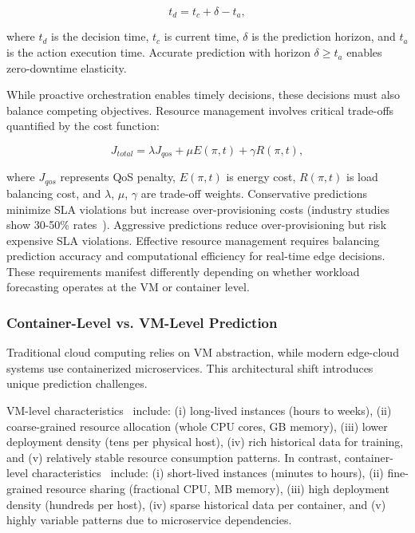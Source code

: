 \begin{equation}
t_d = t_c + \delta - t_a,
\end{equation}

where $t_d$ is the decision time, $t_c$ is current time, $\delta$ is the prediction horizon, and $t_a$ is the action execution time. Accurate prediction with horizon $\delta \geq t_a$ enables zero-downtime elasticity.

While proactive orchestration enables timely decisions, these decisions must also balance competing objectives. Resource management involves critical trade-offs quantified by the cost function:

\begin{equation}
J_{total} = \lambda J_{qos} + \mu E(\pi, t) + \gamma R(\pi, t),
\end{equation}

where $J_{qos}$ represents \ac{QoS} penalty, $E(\pi, t)$ is energy cost, $R(\pi, t)$ is load balancing cost, and $\lambda$, $\mu$, $\gamma$ are trade-off weights. Conservative predictions minimize \ac{SLA} violations but increase over-provisioning costs (industry studies show 30-50\% rates~\cite{raith2024opportunistic}). Aggressive predictions reduce over-provisioning but risk expensive \ac{SLA} violations. Effective resource management requires balancing prediction accuracy and computational efficiency for real-time edge decisions. These requirements manifest differently depending on whether workload forecasting operates at the \ac{VM} or container level.

\subsubsection{Container-Level vs. \acs{VM}-Level Prediction}
\label{sec:ch2_container_prediction}

Traditional cloud computing relies on \ac{VM} abstraction, while modern edge-cloud systems use containerized microservices. This architectural shift introduces unique prediction challenges.

\ac{VM}-level characteristics~\cite{tirmazi2020borg} include: (i) long-lived instances (hours to weeks), (ii) coarse-grained resource allocation (whole \ac{CPU} cores, \ac{GB} memory), (iii) lower deployment density (tens per physical host), (iv) rich historical data for training, and (v) relatively stable resource consumption patterns. In contrast, container-level characteristics~\cite{10202641, 10417087, 10029931} include: (i) short-lived instances (minutes to hours), (ii) fine-grained resource sharing (fractional \ac{CPU}, \ac{MB} memory), (iii) high deployment density (hundreds per host), (iv) sparse historical data per container, and (v) highly variable patterns due to microservice dependencies.

